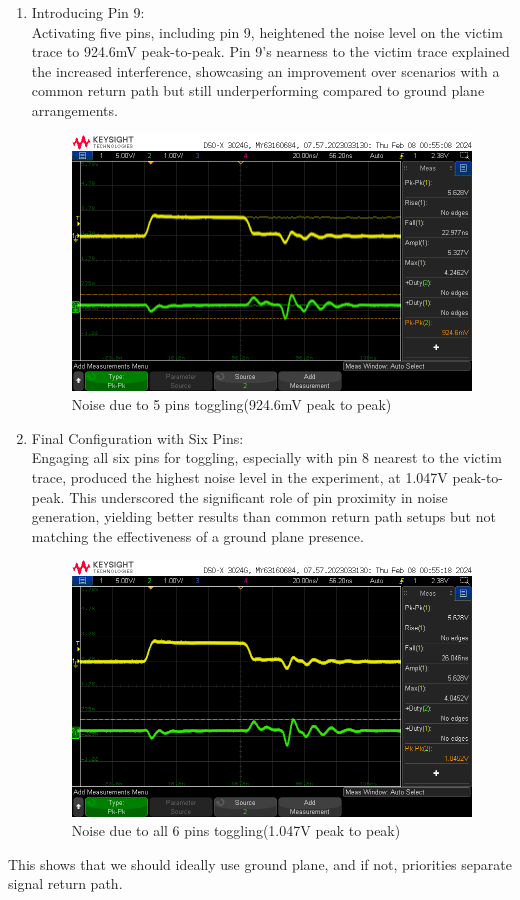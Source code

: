 \documentclass[a4paper,11pt]{article}%
\begin{document}
\begin{enumerate}
	\item Introducing Pin 9:\\ Activating five pins, including pin 9, heightened the noise level on the victim trace to 924.6mV peak-to-peak. Pin 9's nearness to the victim trace explained the increased interference, showcasing an improvement over scenarios with a common return path but still underperforming compared to ground plane arrangements.
	\begin{figure}[H]
		\centering
		\includegraphics[scale=0.5]{figures/noise_np__sr5.png}
		\caption{Noise due to 5 pins toggling(924.6mV peak to peak)}
		\label{noise_np__sr5}
	\end{figure}
	
	\item Final Configuration with Six Pins:\\ Engaging all six pins for toggling, especially with pin 8 nearest to the victim trace, produced the highest noise level in the experiment, at 1.047V peak-to-peak. This underscored the significant role of pin proximity in noise generation, yielding better results than common return path setups but not matching the effectiveness of a ground plane presence.
	\begin{figure}[H]
		\centering
		\includegraphics[scale=0.5]{figures/noise_np__sr6.png}
		\caption{Noise due to all 6 pins toggling(1.047V peak to peak)}
		\label{noise_np__sr6}
	\end{figure}
	
\end{enumerate}
This shows that we should ideally use ground plane, and if not, priorities separate signal return path.
\end{document}

